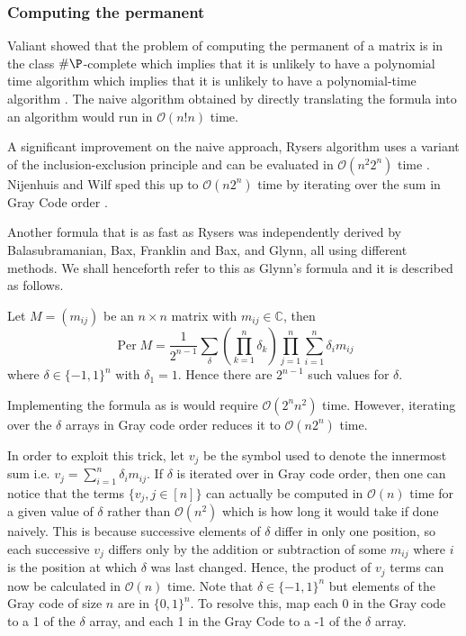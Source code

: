 \documentclass[11pt]{article}
\theoremstyle{theorem}
\theoremstyle{remark}
\theoremstyle{plain}
\theoremstyle{definition}
\DeclareMathOperator*{\Per}{\mathrm{Per}}
\begin{document}
\subsubsection{Computing the permanent}\label{prelim_permanent_calc}
Valiant showed that the problem of computing the permanent of a matrix is in the class $\# \P$-complete which implies that it is unlikely to have a polynomial time algorithm which implies that it is unlikely to have a polynomial-time algorithm \cite{valiant1979}. The naive algorithm obtained by directly translating the formula into an algorithm would run in $\mathcal{O}(n!n)$ time.

A significant improvement on the naive approach, Rysers algorithm uses a variant of the inclusion-exclusion principle and can be evaluated in $\mathcal{O}(n^2 2^n)$ time  \cite{ryser_1963}. Nijenhuis and Wilf sped this up to $\mathcal{O}(n2^n)$ time by iterating over the sum in Gray Code order \cite{Nijenhuis1978}.

Another formula that is as fast as Rysers was independently derived by Balasubramanian\cite{balasubramanian1980}, Bax\cite{bax1998}, Franklin and Bax\cite{bax1996}, and Glynn\cite{glynn2010}, all using different methods. We shall henceforth refer to this as Glynn's formula and it is described as follows.

Let $M = (m_{ij})$ be an $n \times n$ matrix with $m_{ij} \in \mathbb{C}$, then
\begin{equation}
\Per M = \frac{1}{2^{n-1}} \sum_\delta \left( \prod_{k=1}^n \delta_k \right) \prod_{j=1}^n\sum_{i=1}^n \delta_i m_{ij}
\end{equation}
where $\delta \in \{-1, 1\}^n$ with $\delta_1 = 1$. Hence there are $2^{n-1}$ such values for $\delta$.

Implementing the formula as is would require $\mathcal{O}(2^n n^2)$ time. However, iterating over the $\delta$ arrays in Gray code order reduces it to $\mathcal{O}(n 2^n)$ time.

In order to exploit this trick, let $v_j$ be the symbol used to denote the innermost sum i.e. $v_j = \sum_{i=1}^n \delta_i m_{ij}$. If $\delta$ is iterated over in Gray code order, then one can notice that the terms $\{ v_j, j \in [n]\}$ can actually be computed in $\mathcal{O}(n)$ time for a given value of $\delta$ rather than $\mathcal{O}(n^2)$ which is how long it would take if done naively. This is because successive elements of $\delta$ differ in only one position, so each successive $v_j$ differs only by the addition or subtraction of some $m_{ij}$ where $i$ is the position at which $\delta$ was last changed. Hence, the product of $v_j$ terms can now be calculated in $\mathcal{O}(n)$ time. Note that $\delta \in \{-1, 1\}^n$ but elements of the Gray code of size $n$ are in $\{0, 1\}^n$. To resolve this, map each 0 in the Gray code to a 1 of the $\delta$ array, and each 1 in the Gray Code to a -1 of the $\delta$ array.
\end{document}

